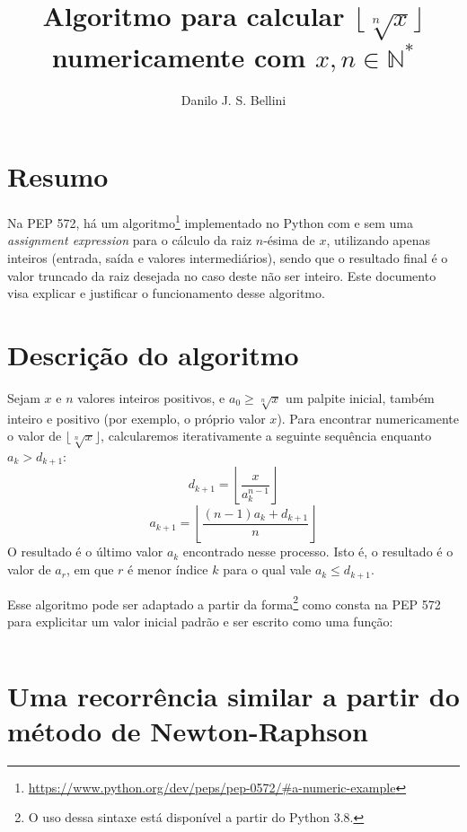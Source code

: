 \documentclass{article}
\title{Algoritmo para calcular $\lfloor \sqrt[n]{x} \rfloor$
       numericamente com $x, n \in \mathds{N}^*$}
\author{Danilo J. S. Bellini}
\begin{document}
\maketitle

\section*{Resumo}

Na PEP 572, há um algoritmo\footnote{
  \url{https://www.python.org/dev/peps/pep-0572/\#a-numeric-example}
} implementado no Python com e sem uma \emph{assignment expression}
para o cálculo da raiz $n$-ésima de $x$,
utilizando apenas inteiros (entrada, saída e valores intermediários),
sendo que o resultado final é o valor truncado da raiz desejada
no caso deste não ser inteiro.
Este documento visa explicar e justificar
o funcionamento desse algoritmo.


\section*{Descrição do algoritmo}

Sejam $x$ e $n$ valores inteiros positivos,
e $a_0 \ge \sqrt[n]{x}$ um palpite inicial, também inteiro e positivo
(por exemplo, o próprio valor $x$).
Para encontrar numericamente o valor de $\lfloor \sqrt[n]{x} \rfloor$,
calcularemos iterativamente a seguinte sequência
enquanto $a_k > d_{k+1}$:
\[d_{k+1} = \left\lfloor \dfrac{x}{a_k^{n-1}} \right\rfloor\]
\[a_{k+1} = \left\lfloor \dfrac{(n-1) a_k + d_{k+1}}{n} \right\rfloor\]
O resultado é o último valor $a_k$ encontrado nesse processo.
Isto é, o resultado é o valor de $a_r$,
em que $r$ é menor índice $k$ para o qual vale $a_k \le d_{k+1}$.

Esse algoritmo pode ser adaptado
a partir da forma\footnote{
  O uso dessa sintaxe está disponível a partir do Python 3.8.
} como consta na PEP 572
para explicitar um valor inicial padrão e ser escrito como uma função:

\begin{center}
  \begin{minipage}{7cm}
    \inputminted{python}{nth_root.py}
  \end{minipage}
\end{center}


\section*{Uma recorrência similar a partir do método de Newton-Raphson}
\end{document}
